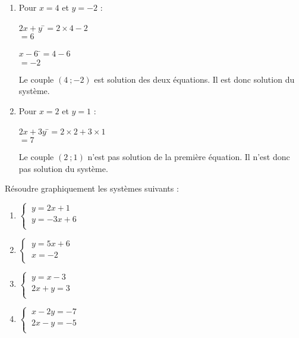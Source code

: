 \documentclass[a4paper,11pt,exos]{nsi} %
\begin{document}
\begin{enumerate}
    \item Pour $x=4$ et $y=-2$ :
    \begin{multicols}{2}
        \begin{tabbing}
            $2x+y$ \=$=2\times 4-2$\\
            \>  $=6$
        \end{tabbing}
        \begin{tabbing}
            $x-6$   \=$=4-6$\\
            \>  $=-2$
        \end{tabbing}
    \end{multicols}
    Le couple $(4\ ;-2)$ est solution des deux équations. Il est donc solution du système.
    
    \item Pour $x=2$ et $y=1$ :
    \begin{tabbing}
        $2x+3y$ \=$=2\times 2+3\times 1$\\
        \>  $=7$
    \end{tabbing}
    Le couple $(2\ ;1)$ n'est pas solution de la première équation. Il n'est donc pas solution du système. 
\end{enumerate}


\begin{exercice}[ ]
	
	\begin{multicols}{3}
		Résoudre graphiquement les systèmes suivants :\\
		\vspace{1cm}
		\begin{enumerate}
			\item 	$\left\{
			\begin{array}{l}
				\ y=2x+1 \\
				\ y=-3x+6 \\
			\end{array} \right.$
			\item 	$\left\{
			\begin{array}{l}
				\ y=5x+6 \\
				\ x=-2 \\
			\end{array} \right.$
			\item 	$\left\{
			\begin{array}{l}
				\ y=x-3 \\
				\ 2x+y=3 \\
			\end{array} \right.$
			\item 	$\left\{
			\begin{array}{l}
				\ x-2y=-7 \\
				\ 2x-y=-5 \\
			\end{array} \right.$	
		\end{enumerate}
	\end{multicols}
\end{exercice}
\end{document}
